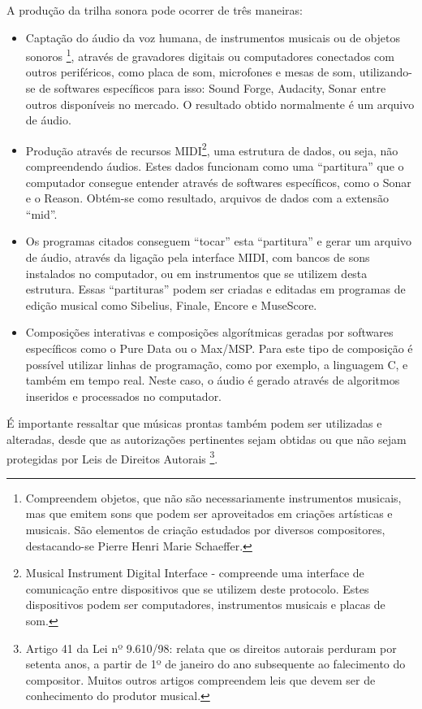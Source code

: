 A produção da trilha sonora pode ocorrer de três maneiras:
\begin{itemize}
\item Captação do áudio da voz humana, de instrumentos musicais ou de objetos sonoros \footnote{Compreendem objetos, que não são necessariamente instrumentos musicais, mas que emitem sons que podem ser aproveitados em criações artísticas e musicais. São elementos de criação estudados por diversos 
compositores, destacando-se Pierre Henri Marie Schaeffer.}, através de gravadores digitais ou computadores conectados com outros periféricos, como placa de som, microfones e mesas de som, utilizando-se de softwares específicos para isso: Sound Forge, Audacity, Sonar entre outros disponíveis no mercado. O resultado obtido normalmente é um arquivo de áudio.
\item Produção através de recursos MIDI\footnote{Musical Instrument Digital Interface - compreende uma interface de comunicação entre dispositivos que se utilizem deste protocolo. Estes dispositivos podem ser computadores, instrumentos musicais e placas de som.}, uma estrutura de dados, ou seja, não compreendendo áudios. Estes dados funcionam como uma ``partitura'' que o computador consegue entender através de softwares específicos, como o Sonar e o Reason. Obtém-se como resultado, arquivos de dados com a extensão ``mid''.
\item Os programas citados conseguem ``tocar'' esta ``partitura'' e gerar um arquivo de áudio, através da ligação pela interface MIDI, com bancos de sons instalados no computador, ou em instrumentos que se 
utilizem desta estrutura. Essas ``partituras'' podem ser criadas e editadas em programas de edição musical como Sibelius, Finale, Encore e MuseScore.
\item Composições interativas e composições algorítmicas geradas por softwares específicos como o Pure Data ou o Max/MSP. Para este tipo de composição é possível utilizar linhas de programação, como por 
exemplo, a linguagem C, e também em tempo real. Neste caso, o áudio é gerado através de algoritmos inseridos e processados no computador.
\end{itemize}

É importante ressaltar que músicas prontas também podem ser utilizadas e alteradas, desde que as autorizações pertinentes sejam obtidas ou que não sejam protegidas por Leis de Direitos Autorais
\footnote{Artigo 41 da Lei nº 9.610/98: relata que os direitos autorais perduram por setenta anos, a partir de 1º de janeiro do ano subsequente ao falecimento do compositor. Muitos outros artigos compreendem leis que devem ser de conhecimento do produtor musical.}. 

